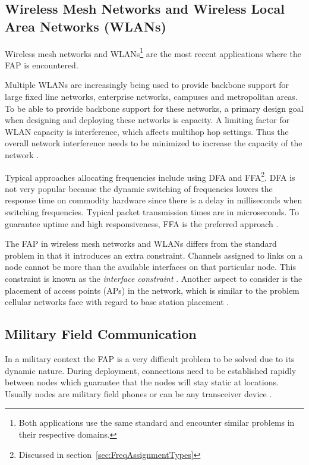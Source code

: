 \subsection{Wireless Mesh Networks and Wireless Local Area Networks (WLANs)}
Wireless mesh networks and WLANs\footnote{Both applications use the same standard and encounter similar problems in their respective domains.} are the most recent applications where the \gls{FAP} is encountered. 

Multiple WLANs are increasingly being used to provide backbone support for large fixed line networks, enterprise networks, campuses and metropolitan areas\cite{MultiradioMeshNetworks}. To be able to provide backbone support for these networks, a primary design goal when designing and deploying these networks is capacity\cite{MultiradioMeshNetworks}. A limiting factor for WLAN capacity is interference, which affects multihop hop settings. Thus the overall network interference needs to be minimized to increase the capacity of the network \cite{MultiradioMeshNetworks}. 

Typical approaches allocating frequencies include using \gls{DFA} and \gls{FFA}\footnote{Discussed in section~\ref{sec:FreqAssignmentTypes}}. \gls{DFA} is not very popular because the dynamic switching of frequencies lowers the response time on commodity hardware since there is a delay in milliseconds when switching frequencies. Typical packet transmission times are in microseconds. To guarantee uptime and high responsiveness, \gls{FFA} is the preferred approach \cite{MultiradioMeshNetworks}.

The \gls{FAP} in wireless mesh networks and WLANs differs from the standard problem in that it introduces an extra constraint. Channels assigned to links on a node cannot be more than the available interfaces on that particular node. This constraint is known as the \emph{interface constraint} \cite{MultiradioMeshNetworks}. Another aspect to consider is the placement of access points (APs) in the network, which is similar to the problem cellular networks face with regard to base station placement \cite{Karen2004}.

\subsection{Military Field Communication}
In a military context the \gls{FAP} is a very difficult problem to be solved due to its dynamic nature\cite{CALMA}. During deployment, connections need to be established rapidly between nodes which guarantee that the nodes will stay static at locations. Usually nodes are military field phones or can be any transceiver device \cite{CALMA,DynamicFAP}. 

